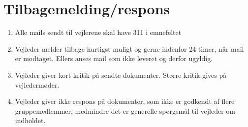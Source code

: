 \section{Tilbagemelding/respons}
\begin{enumerate}
\item{Alle mails sendt til vejlerene skal have 311 i emnefeltet}
\item{Vejleder melder tilbage hurtigst muligt og gerne indenfor 24 timer, når mail er modtaget. Ellers
anses mail som ikke leveret og derfor ugyldig.}
\item{Vejleder giver kort kritik på sendte dokumenter. Større kritik gives på vejledermøder.}
\item{Vejleder giver ikke respons på dokumenter, som ikke er godkendt af flere gruppemedlemmer,
medmindre det er generelle spørgsmål til vejleder om indholdet.}
\end{enumerate}
